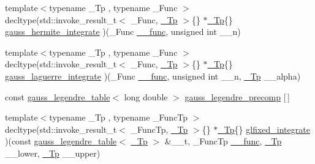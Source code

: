 \begin{DoxyCompactItemize}
{\footnotesize template$<$typename \+\_\+\+Tp , typename \+\_\+\+Func $>$ }\\decltype(std\+::invoke\+\_\+result\+\_\+t$<$ \+\_\+\+Func, \hyperlink{namespace____gnu__cxx_a3b19a9c800ca194374ef9172290f7d79}{\+\_\+\+Tp} $>$\{\} $\ast$\hyperlink{namespace____gnu__cxx_a3b19a9c800ca194374ef9172290f7d79}{\+\_\+\+Tp}\{\} \hyperlink{namespace____gnu__cxx_a0e320b6b2f1b1befb9019e587648534d}{gauss\+\_\+hermite\+\_\+integrate} )(\+\_\+\+Func \hyperlink{namespace____gnu__cxx_af2b2f0c7a2ae72b922b1afefae5a65b2}{\+\_\+\+\_\+func}, unsigned int \+\_\+\+\_\+n)
\item 
{\footnotesize template$<$typename \+\_\+\+Tp , typename \+\_\+\+Func $>$ }\\decltype(std\+::invoke\+\_\+result\+\_\+t$<$ \+\_\+\+Func, \hyperlink{namespace____gnu__cxx_a3b19a9c800ca194374ef9172290f7d79}{\+\_\+\+Tp} $>$\{\} $\ast$\hyperlink{namespace____gnu__cxx_a3b19a9c800ca194374ef9172290f7d79}{\+\_\+\+Tp}\{\} \hyperlink{namespace____gnu__cxx_a93b814c5d08779f98698e863d0e21a5f}{gauss\+\_\+laguerre\+\_\+integrate} )(\+\_\+\+Func \hyperlink{namespace____gnu__cxx_af2b2f0c7a2ae72b922b1afefae5a65b2}{\+\_\+\+\_\+func}, unsigned int \+\_\+\+\_\+n, \hyperlink{namespace____gnu__cxx_a3b19a9c800ca194374ef9172290f7d79}{\+\_\+\+Tp} \+\_\+\+\_\+alpha)
\item 
const \hyperlink{struct____gnu__cxx_1_1gauss__legendre__table}{gauss\+\_\+legendre\+\_\+table}$<$ long double $>$ \hyperlink{namespace____gnu__cxx_a2e3dcc11970f62e2c7e9d81502b2f84b}{gauss\+\_\+legendre\+\_\+precomp} \mbox{[}$\,$\mbox{]}
\item 
{\footnotesize template$<$typename \+\_\+\+Tp , typename \+\_\+\+Func\+Tp $>$ }\\decltype(std\+::invoke\+\_\+result\+\_\+t$<$ \+\_\+\+Func\+Tp, \hyperlink{namespace____gnu__cxx_a3b19a9c800ca194374ef9172290f7d79}{\+\_\+\+Tp} $>$\{\} $\ast$\hyperlink{namespace____gnu__cxx_a3b19a9c800ca194374ef9172290f7d79}{\+\_\+\+Tp}\{\} \hyperlink{namespace____gnu__cxx_a5fca3754ea9feb1fb2448da7df080ef6}{glfixed\+\_\+integrate} )(const \hyperlink{struct____gnu__cxx_1_1gauss__legendre__table}{gauss\+\_\+legendre\+\_\+table}$<$ \hyperlink{namespace____gnu__cxx_a3b19a9c800ca194374ef9172290f7d79}{\+\_\+\+Tp} $>$ \&\+\_\+\+\_\+t, \+\_\+\+Func\+Tp \hyperlink{namespace____gnu__cxx_af2b2f0c7a2ae72b922b1afefae5a65b2}{\+\_\+\+\_\+func}, \hyperlink{namespace____gnu__cxx_a3b19a9c800ca194374ef9172290f7d79}{\+\_\+\+Tp} \+\_\+\+\_\+lower, \hyperlink{namespace____gnu__cxx_a3b19a9c800ca194374ef9172290f7d79}{\+\_\+\+Tp} \+\_\+\+\_\+upper)

\end{DoxyCompactItemize}
